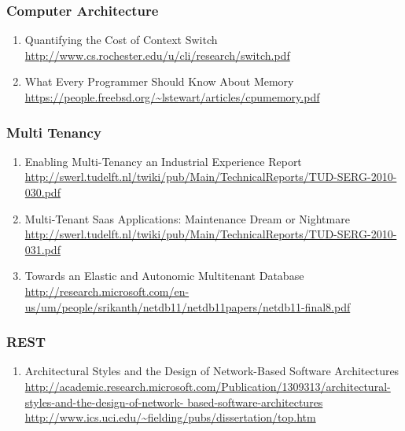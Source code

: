 \documentclass{article}
\begin{document}
\subsubsection{Computer Architecture}
\begin{enumerate}
	\item {Quantifying the Cost of Context Switch\\
\url{http://www.cs.rochester.edu/u/cli/research/switch.pdf}}
	\item {What Every Programmer Should Know About Memory\\
\url{https://people.freebsd.org/~lstewart/articles/cpumemory.pdf}}
\end{enumerate}

\subsubsection{Multi Tenancy}
\begin{enumerate}
	\item {Enabling Multi-Tenancy an Industrial Experience Report\\
\href{http://swerl.tudelft.nl/twiki/pub/Main/TechnicalReports/TUD-SERG-2010-030.pdf}{http://swerl.tudelft.nl/twiki/pub/Main/TechnicalReports/TUD-SERG-2010-030.pdf}}
	\item {Multi-Tenant Saas Applications: Maintenance Dream or Nightmare\\
\href{http://swerl.tudelft.nl/twiki/pub/Main/TechnicalReports/TUD-SERG-2010-031.pdf}{http://swerl.tudelft.nl/twiki/pub/Main/TechnicalReports/TUD-SERG-2010-031.pdf}}
	\item {Towards an Elastic and Autonomic Multitenant Database\\ \url{http://research.microsoft.com/en-us/um/people/srikanth/netdb11/netdb11papers/netdb11-final8.pdf}}
\end{enumerate}

\subsubsection{REST}
\begin{enumerate}
	\item {Architectural Styles and the Design of Network-Based Software Architectures\\
\href{http://academic.research.microsoft.com/Publication/1309313/architectural-styles-and-the-design-of-network-
	based-software-architectures}{http://academic.research.microsoft.com/Publication/1309313/architectural-styles-and-the-design-of-network-
	based-software-architectures}\\
\url{http://www.ics.uci.edu/~fielding/pubs/dissertation/top.htm}}
\end{enumerate}
\end{document}

